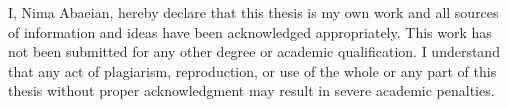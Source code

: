 \begin{originality}

I, Nima Abaeian, hereby declare that this thesis is my own work and all sources of information and ideas have been acknowledged appropriately. This work has not been submitted for any other degree or academic qualification. I understand that any act of plagiarism, reproduction, or use of the whole or any part of this thesis without proper acknowledgment may result in severe academic penalties.
\end{originality}
